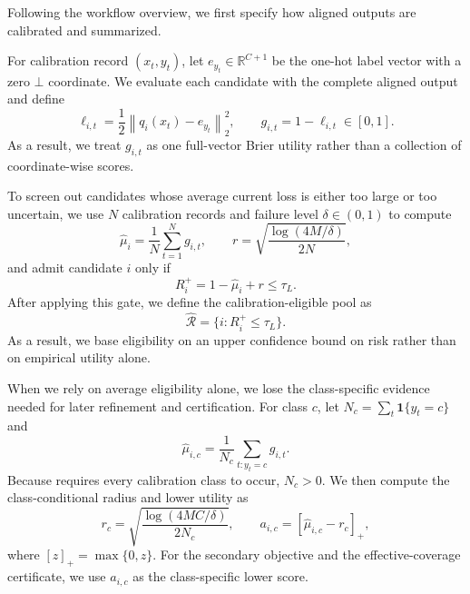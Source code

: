 Following the workflow overview, we first specify how aligned outputs are
calibrated and summarized.

For calibration record $(x_t,y_t)$, let $e_{y_t}\in\mathbb R^{C+1}$ be the
one-hot label vector with a zero $\bot$ coordinate. We evaluate each candidate
with the complete aligned output and define
\begin{equation}
\ell_{i,t}=\frac12\left\|q_i(x_t)-e_{y_t}\right\|_2^2,
\qquad
g_{i,t}=1-\ell_{i,t}\in[0,1].
\label{eq:brier_utility}
\end{equation}
As a result, we treat $g_{i,t}$ as one full-vector Brier utility rather than a
collection of coordinate-wise scores.

 To screen out candidates whose average
current loss is either too large or too
uncertain, we use $N$ calibration records and failure level
$\delta\in(0,1)$ to compute
\begin{equation}
\widehat\mu_i=\frac1N\sum_{t=1}^{N}g_{i,t},
\qquad
r=\sqrt{\frac{\log(4M/\delta)}{2N}},
\label{eq:overall_calibration}
\end{equation}
and admit candidate $i$ only if
\begin{equation}
R_i^+=1-\widehat\mu_i+r\le\tau_L.
\label{eq:risk_gate}
\end{equation}
After applying this gate, we define the calibration-eligible pool as
\begin{equation}
\widehat{\mathcal R}=\{i:R_i^+\le\tau_L\}.
\label{eq:eligible_pool}
\end{equation}
As a result, we base eligibility on an upper confidence bound on risk rather
than on empirical utility alone.

 When we rely on average eligibility alone, we
lose the class-specific evidence needed for later refinement and
certification. For class $c$, let
$N_c=\sum_t\mathbf 1\{y_t=c\}$ and
\begin{equation}
\widehat\mu_{i,c}=\frac1{N_c}\sum_{t:y_t=c}g_{i,t}.
\end{equation}
Because \Fname requires every calibration class to occur, $N_c>0$.
We then compute the class-conditional radius and lower utility as
\begin{equation}
r_c=\sqrt{\frac{\log(4MC/\delta)}{2N_c}},
\qquad
a_{i,c}=\left[\widehat\mu_{i,c}-r_c\right]_+,
\label{eq:class_lower_utility}
\end{equation}
where $[z]_+=\max\{0,z\}$.
For the secondary objective and the effective-coverage certificate, we use
$a_{i,c}$ as the class-specific lower score.

